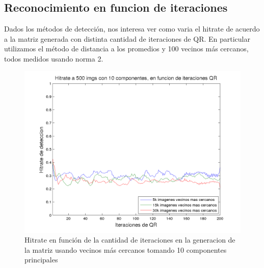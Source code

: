 
\subsection{Reconocimiento en funcion de iteraciones}
Dados los m\'etodos de detecci\'on, nos interesa ver como varia el hitrate
de acuerdo a la matriz generada con distinta cantidad de iteraciones de QR. En particular
utilizamos el m\'etodo de distancia a los promedios y 100 vecinos m\'as cercanos, todos
medidos usando norma 2.

\begin{figure}[H]
\begin {center}
\includegraphics[width=\hrwidth]{plots/HR_10_1.png}
\end {center}
\caption{Hitrate en funci\'on de la cantidad de iteraciones en la generacion de la matriz
usando vecinos m\'as cercanos tomando 10 componentes principales}
\label{fig:HR10Neig}
\end{figure}


